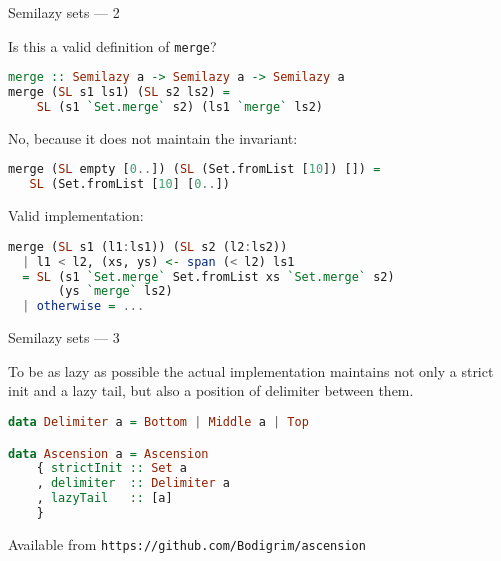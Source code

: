 \documentclass[handout]{beamer}
\begin{document}
\begin{frame}[fragile]{Semilazy sets --- 2}

Is this a valid definition of {\tt merge}?

\begin{lstlisting}[language=Haskell]
merge :: Semilazy a -> Semilazy a -> Semilazy a
merge (SL s1 ls1) (SL s2 ls2) =
    SL (s1 `Set.merge` s2) (ls1 `merge` ls2)
\end{lstlisting}

\pause
No, because it does not maintain the invariant:

\begin{lstlisting}[language=Haskell]
merge (SL empty [0..]) (SL (Set.fromList [10]) []) =
   SL (Set.fromList [10] [0..])
\end{lstlisting}

\pause
Valid implementation:

\begin{lstlisting}[language=Haskell]
merge (SL s1 (l1:ls1)) (SL s2 (l2:ls2))
  | l1 < l2, (xs, ys) <- span (< l2) ls1
  = SL (s1 `Set.merge` Set.fromList xs `Set.merge` s2)
       (ys `merge` ls2)
  | otherwise = ...
\end{lstlisting}

\end{frame}

\begin{frame}[fragile]{Semilazy sets --- 3}

To be as lazy as possible
the actual implementation maintains not only a strict init
and a lazy tail, but also a position of delimiter between them.

\begin{lstlisting}[language=Haskell]
data Delimiter a = Bottom | Middle a | Top

data Ascension a = Ascension
    { strictInit :: Set a
    , delimiter  :: Delimiter a
    , lazyTail   :: [a]
    }
\end{lstlisting}

\pause
Available from {\tt https://github.com/Bodigrim/ascension}

\end{frame}
\end{document}
